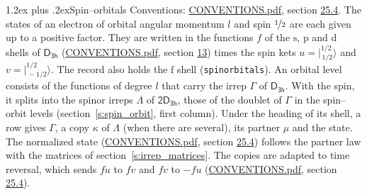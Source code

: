 \documentclass[10pt,a4paper]{article}
\makeatletter
\renewcommand\section{\@startsection{section}{1}{\z@}{-3ex plus -1ex minus -.2ex}%
  {1.2ex plus .2ex}{\normalfont\large\sffamily\bfseries\color{parttitle}}}
\numberwithin{equation}{section}
\newcommand{\grp}[1]{\mathsf{#1}}
\newcommand{\orbital}[1]{\mathrm{#1}}
\newcommand{\mult}{\kappa}
\newcommand{\intx}{\mu}
\newcommand{\jm}[2]{\bigl\lvert{}^{#1}_{\,#2}\bigr\rangle}
\makeatother
\begin{document}
\section{Spin--orbitals}\label{s:spin_orbitals}
Conventions: \href{../../CONVENTIONS.pdf}{CONVENTIONS.pdf}, section \href{../../CONVENTIONS.pdf\#conv.25.4}{25.4}.
\leavevmode\label{n:index.orbital.l}The states of an electron of orbital angular momentum $l$ and spin $\nicefrac{1}{2}$ are each given up to a positive factor. \label{n:local.spinor.uv}\label{n:local.function.f}They are written in the functions $f$ of the $\orbital{s}$, $\orbital{p}$ and $\orbital{d}$ shells of \href{../../../rotation/data/pdf/D3h.pdf}{$\grp{D_{3h}}$} (\href{../../CONVENTIONS.pdf}{CONVENTIONS.pdf}, section \href{../../../rotation/CONVENTIONS.pdf\#conv.13}{13}) times the spin kets $u = \jm{1/2}{1/2}$ and $v = \jm{1/2}{-1/2}$. The record also holds the $\orbital{f}$ shell (\texttt{spinorbitals}). An orbital level consists of the functions of degree $l$ that carry the irrep $\Gamma$ of \href{../../../rotation/data/pdf/D3h.pdf}{$\grp{D_{3h}}$}. With the spin, it splits into the spinor irreps $\Lambda$ of $\grp{2D_{3h}}$, those of the doublet of $\Gamma$ in the spin--orbit levels (section~\ref{s:spin_orbit}, first column). \label{n:head.state}Under the heading of its shell, a row gives $\Gamma$, a copy $\mult$ of $\Lambda$ (when there are several), its partner $\intx$ and the state. The normalized state (\href{../../CONVENTIONS.pdf}{CONVENTIONS.pdf}, section \href{../../CONVENTIONS.pdf\#conv.25.4}{25.4}) follows the partner law with the matrices of section~\ref{s:irrep_matrices}. The copies are adapted to time reversal, which sends $f u$ to $f v$ and $f v$ to $-f u$ (\href{../../CONVENTIONS.pdf}{CONVENTIONS.pdf}, section \href{../../CONVENTIONS.pdf\#conv.25.4}{25.4}).
\end{document}
